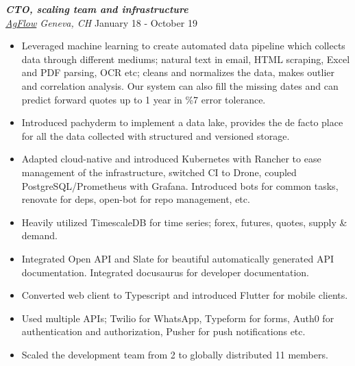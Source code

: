 \documentclass[line, margin]{res}
\begin{document}
\begin{resume}
{\sl \textbf{CTO, scaling team and infrastructure} \\ \href{http://www.agflow.com}{AgFlow} Geneva, CH} \hfill January 18 - October 19 \\
\vspace{-0.3cm}
\begin{itemize}
  \item Leveraged machine learning to create automated data pipeline which collects data through different mediums; natural text in email, HTML scraping, Excel and PDF parsing, OCR etc; cleans and normalizes the data, makes outlier and correlation analysis. Our system can also fill the missing dates and can predict forward quotes up to 1 year in \%7 error tolerance.
  \item Introduced pachyderm to implement a data lake, provides the de facto place for all the data collected with structured and versioned storage.
  \item Adapted cloud-native and introduced Kubernetes with Rancher to ease management of the infrastructure, switched CI to Drone, coupled PostgreSQL/Prometheus with Grafana. Introduced bots for common tasks, renovate for deps, open-bot for repo management, etc.
  \item Heavily utilized TimescaleDB for time series; forex, futures, quotes, supply \& demand.
  \item Integrated Open API and Slate for beautiful automatically generated API documentation. Integrated docusaurus for developer documentation.
  \item Converted web client to Typescript and introduced Flutter for mobile clients. 
  \item Used multiple APIs; Twilio for WhatsApp, Typeform for forms, Auth0 for authentication and authorization, Pusher for push notifications etc.
  \item Scaled the development team from 2 to globally distributed 11 members.
  
\end{itemize}


\end{resume}
\end{document}
